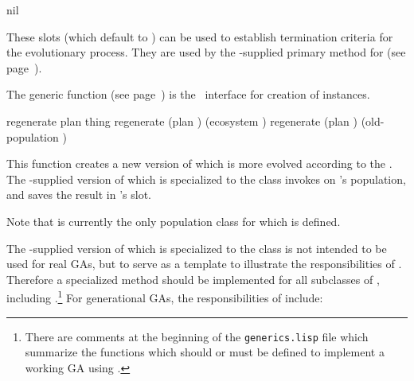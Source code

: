 {{	 {nil}
	
	These slots (which default to ) can be used to establish
	termination criteria for the evolutionary process. They are used by
	the \geco-supplied primary method for  (see 
	page~\pageref{evolution-termination-p}).	
	\par}%
	
	\gap\filbreak
	
	{\samepage
		
		The generic function  (see page~\pageref{method:make-genetic-plan})
		is the \geco\ interface for creation of  instances.
	\par}%
	
	\gap
	
	\filbreak
	{\samepage
		
		
		\Defgeneric regenerate {plan thing}
		 regenerate {(plan ) (ecosystem )}
		 regenerate {(plan ) (old-population )}
		\label{method:regenerate}
		
		This function creates a new version of  which is more evolved according
		to the  . The \geco-supplied version of  which
		is specialized to the class  invokes  on
		's population, and saves the result in 's
		 slot.
		\par}%
	
	\gap
	
	\filbreak
	Note that  is currently the only
	population class for which \hbox{} is defined.
	
	\filbreak
	The \geco-supplied version of  which is specialized to the class
	 is not intended to be used for real GAs, but to serve
	as a template to illustrate the responsibilities of . Therefore a
	specialized method should be implemented for all subclasses of ,
	including .\footnote{There are comments at the
		beginning of the {\tt generics.lisp} file which summarize the functions which should or
		must be defined to implement a working GA using \geco.} For generational
	GAs, the responsibilities of  include:
	\filbreak
	{\samepage
		\begin{itemize}
			

\end{itemize}}}
